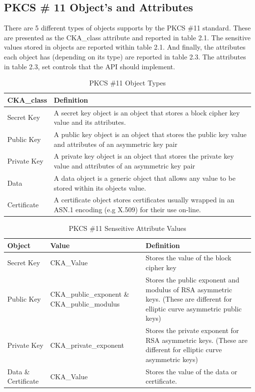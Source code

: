 \documentclass[bsc,frontabs,twoside,singlespacing,parskip,deptreport]{infthesis}     %
\begin{document}
\pagebreak
\subsection{PKCS \# 11 Object's and Attributes}

There are 5 different types of objects supports by the PKCS \#11 standard. These are presented as the CKA\_class attribute and reported in table 2.1. The sensitive values stored in objects are reported within table 2.1. And finally, the attributes each object has (depending on its type) are reported in table 2.3. The attributes in table 2.3, set controls that the API should implement.

\begin{table}[H]
\begin{tabular}{|l|p{10cm}|}
\hline 
CKA\_class & Definition\\
\hline
Secret Key & A secret key object is an object that stores a block cipher key value and its attributes.\\
\hline
Public Key & A public key object is an object that stores the public key value and attributes of an asymmetric key pair\\
\hline
Private Key & A private key object is an object that stores the private key value and attributes of an asymmetric key pair\\
\hline
Data & A data object is a generic object that allows any value to be stored within its objects value.\\
\hline
Certificate & A certificate object stores certificates usually wrapped in an ASN.1 encoding (e.g X.509) for their use on-line.\\
\hline
\end{tabular}
\caption{PKCS \#11 Object Types}
\end{table}

\begin{table}[H]
\hskip-1.5cm\begin{tabular}{|p{3cm}|p{5cm}|p{10cm}|}
\hline
Object & Value & Definition\\
\hline
Secret Key & CKA\_Value & Stores the value of the block cipher key\\
\hline
Public Key & CKA\_public\_exponent \& CKA\_public\_modulus & Stores the public exponent and modulus of RSA asymmetric keys. (These are different for elliptic curve asymmetric public keys)\\
\hline
Private Key & CKA\_private\_exponent & Stores the private exponent for RSA asymmetric keys. (These are different for elliptic curve asymmetric keys)\\
\hline
Data \& Certificate & CKA\_Value & Stores the value of the data or certificate.\\
\hline
\end{tabular}
\caption{PKCS \#11 Senseitive Attribute Values}
\end{table}
\end{document}
